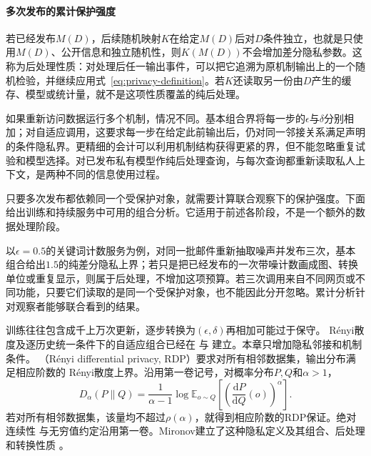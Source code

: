 \paragraph{多次发布的累计保护强度}
\label{sec:privacy-repeated-use}

若已经发布$M(D)$，后续随机映射$K$在给定$M(D)$后对$D$条件独立，也就是只使用$M(D)$、公开信息和独立随机性，则$K(M(D))$不会增加差分隐私参数。这称为后处理性质：对处理后任一输出事件，可以把它追溯为原机制输出上的一个随机检验，并继续应用式~\eqref{eq:privacy-definition}。若$K$还读取另一份由$D$产生的缓存、模型或统计量，就不是这项性质覆盖的纯后处理。

如果重新访问数据运行多个机制，情况不同。基本组合界将每一步的$\epsilon$与$\delta$分别相加；对自适应调用，这要求每一步在给定此前输出后，仍对同一邻接关系满足声明的条件隐私界。更精细的会计可以利用机制结构获得更紧的界，但不能忽略重复试验和模型选择。对已发布私有模型作纯后处理查询，与每次查询都重新读取私人上下文，是两种不同的信息使用过程。

只要多次发布都依赖同一个受保护对象，就需要计算联合观察下的保护强度。下面给出训练和持续服务中可用的组合分析。它适用于前述各阶段，不是一个额外的数据处理阶段。

以$\epsilon=0.5$的关键词计数服务为例，对同一批邮件重新抽取噪声并发布三次，基本组合给出$1.5$的纯差分隐私上界；若只是把已经发布的一次带噪计数画成图、转换单位或重复显示，则属于后处理，不增加这项预算。若三次调用来自不同网页或不同功能，只要它们读取的是同一个受保护对象，也不能因此分开忽略。累计分析针对观察者能够联合看到的结果。

训练往往包含成千上万次更新，逐步转换为$(\epsilon,\delta)$再相加可能过于保守。
Rényi散度及逐历史统一条件下的自适应组合已经在
与
建立。本章只增加隐私邻接和机制条件。
（Rényi differential privacy, RDP）要求对所有相邻数据集，输出分布满足相应阶数的
Rényi散度上界。沿用第一卷记号，对概率分布$P,Q$和$\alpha>1$，
\begin{equation}
 D_\alpha(P\|Q)=\frac{1}{\alpha-1}
 \log\mathbb E_{o\sim Q}
 \left[\left(\frac{\mathrm dP}{\mathrm dQ}(o)\right)^\alpha\right].
 \label{eq:privacy-renyi}
\end{equation}
若对所有相邻数据集，该量均不超过$\rho(\alpha)$，就得到相应阶数的RDP保证。绝对连续性
与无穷值约定沿用第一卷。Mironov建立了这种隐私定义及其组合、后处理和转换性质
。

